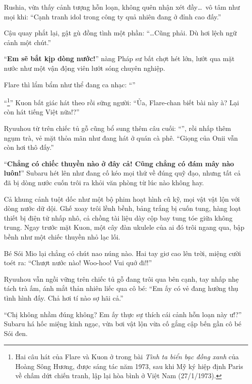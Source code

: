 \documentclass[../main.tex]{subfiles}
\begin{document}
Rushia, vừa thấy cảnh tượng hỗn loạn, không quên nhận xét đầy\dots\ vô tâm như mọi khi: ``Cạnh tranh idol trong công ty quả nhiên đang ở đỉnh cao đấy.''

Cậu quay phắt lại, gật gù đồng tình một phần: ``\dots Cũng phải. Dù hơi lệch ngữ cảnh một chút.''

``\textbf{Em sẽ bắt kịp dòng nước!}'' nàng Pháp sư bất chợt hét lớn, lướt qua mặt nước như một vận động viên lướt sóng chuyên nghiệp.

Flare thì lẩm bẩm như thể đang ca nhạc: ``''

``\footnote{Hai câu hát của Flare và Kuon ở trong bài \textit{Tình ta biển bạc đồng xanh} của Hoàng Sông Hương, được sáng tác năm 1973, sau khi Mỹ ký hiệp định Paris về chấm dứt chiến tranh, lập lại hòa bình ở Việt Nam (27/1/1973).}'' Kuon bất giác hát theo rồi sững người: ``Ủa, Flare-chan biết bài này à? Lại còn hát tiếng Việt nữa!?''

Ryuuhou từ trên chiếc tủ gỗ cũng bổ sung thêm câu cuối: ``'', rồi nhấp thêm ngụm trà, vẻ mặt thỏa mãn như đang hát ở quán cà phê. ``Giọng của Onii vẫn còn hơi thô đấy.''

``\textbf{Chẳng có chiếc thuyền nào ở đây cả! Cũng chẳng có đám mây nào luôn!}'' Subaru hét lên như đang cố kéo mọi thứ về đúng quỹ đạo, nhưng tất cả đã bị dòng nước cuốn trôi ra khỏi văn phòng từ lúc nào không hay.

\ct

Cả khung cảnh tuột dốc như một bộ phim hoạt hình cũ kỹ, mọi vật vật lộn với dòng nước dữ dội. Ghế xoay trôi lềnh bềnh, bảng trắng bị cuốn tung, hàng loạt thiết bị điện tử nhấp nhô, cả chồng tài liệu dày cộp bay tung tóe giữa không trung. Ngay trước mặt Kuon, một cây đàn ukulele của ai đó trôi ngang qua, bập bềnh như một chiếc thuyền nhỏ lạc lối.

Bé Sói Mio lại chẳng có chút nao núng nào. Hai tay giơ cao lên trời, miệng cười toét ra: ``Chượt nước nào! Woo-hoo! Vui quớ đi!!''

Ryuuhou vẫn ngồi vững trên chiếc tủ gỗ đang trôi qua bên cạnh, tay nhấp nhẹ tách trà ấm, ánh mắt thản nhiên liếc qua cô bé: ``Em ấy có vẻ đang hưởng thụ tình hình đấy. Chả hơi tí nào sợ hãi cả.''

``Chị không nhầm đúng không? Em ấy thực sự thích cái cảnh hỗn loạn này ư!?'' Subaru há hốc miệng kinh ngạc, vừa bơi vật lộn vừa cố gắng cập bến gần cô bé Sói đen.
\end{document}
